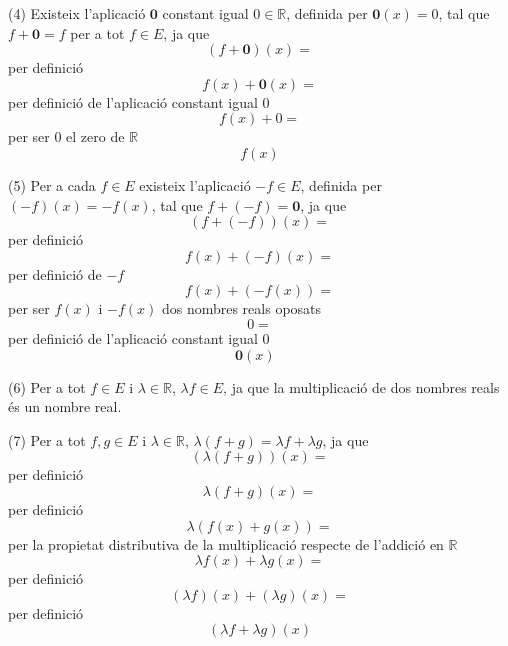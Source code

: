 \begin{solucio}
(4) Existeix l’aplicació $\mathbf{0}$ constant igual $0\in \mathbb{R}$,
definida per $\mathbf{0}(x)=0$, tal que $f+\mathbf{0}=f$ per a tot $f\in E$,
ja que%
\begin{equation*}
(f+\mathbf{0})(x)=
\end{equation*}%
per definició%
\begin{equation*}
f(x)+\mathbf{0}(x)=
\end{equation*}%
per definició de l’aplicació constant igual $0$%
\begin{equation*}
f(x)+0=
\end{equation*}%
per ser $0$ el zero de $\mathbb{R}$%
\begin{equation*}
f(x)
\end{equation*}

(5) Per a cada $f\in E$ existeix l’aplicació $-f\in E$, definida per $%
(-f)(x)=-f(x)$, tal que $f+(-f)=\mathbf{0}$, ja que%
\begin{equation*}
(f+(-f))(x)=
\end{equation*}%
per definició%
\begin{equation*}
f(x)+(-f)(x)=
\end{equation*}%
per definició de $-f$%
\begin{equation*}
f(x)+(-f(x))=
\end{equation*}%
per ser $f(x)$ i $-f(x)$ dos nombres reals oposats%
\begin{equation*}
0=
\end{equation*}%
per definició de l’aplicació constant igual $0$%
\begin{equation*}
\mathbf{0}(x)\text{ }
\end{equation*}

(6) Per a tot $f\in E$ i $\lambda \in \mathbb{R}$, $\lambda f\in E$, ja que
la multiplicació de dos nombres reals és un nombre real.

(7) Per a tot $f,g\in E$ i $\lambda \in \mathbb{R}$, $\lambda (f+g)=\lambda
f+\lambda g$, ja que%
\begin{equation*}
\left( \lambda (f+g)\right) (x)=
\end{equation*}%
per definició%
\begin{equation*}
\lambda \left( f+g\right) (x)=
\end{equation*}%
per definició%
\begin{equation*}
\lambda \left( f(x)+g(x)\right) =
\end{equation*}%
per la propietat distributiva de la multiplicació respecte de l'addició en $\mathbb{R}$%
\begin{equation*}
\lambda f(x)+\lambda g(x)=
\end{equation*}%
per definició%
\begin{equation*}
\left( \lambda f\right) (x)+\left( \lambda g\right) (x)=
\end{equation*}%
per definició%
\begin{equation*}
\left( \lambda f+\lambda g\right) (x)
\end{equation*}


\end{solucio}
